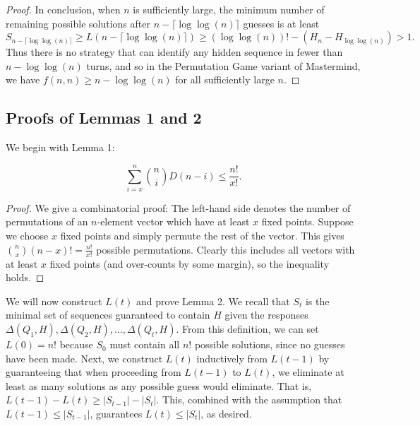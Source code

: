 \documentclass[12pt, a4paper]{article}
\begin{document}
\begin{proof}[Proof]
		 In conclusion, when $n$ is sufficiently large, the minimum number of remaining
		 possible solutions after $n - \lceil \log\log(n) \rceil$ guesses is at least
		 \begin{equation*}
		 S_{n - \lceil \log\log(n) \rceil} \geq L(n - \lceil \log\log(n) \rceil)
		 \ge (\log\log(n))! - (H_n - H_{\log\log(n)})
		 > 1.
		 \end{equation*}
		 Thus there is no strategy that can identify any hidden sequence in fewer than $n-\log\log(n)$ turns, and so in the Permutation Game variant of Mastermind, we have $f(n, n)\ge n - \log\log(n)$ for all sufficiently large $n$.
		\end{proof}
		 
		 
		 \subsection{Proofs of Lemmas 1 and 2}
		 	We begin with Lemma 1:
		 	
		 		\begin{equation*}
		 		\sum_{i=x}^n\binom{n}{i}D(n-i) \le \frac{n!}{x!}.
		 		\end{equation*}
		 
		 	\begin{proof}
		 		We give a combinatorial proof: The left-hand side denotes the number of permutations of an $n$-element vector which have at least $x$ fixed points. Suppose we choose $x$ fixed points and simply permute the rest of the vector. This gives $\binom{n}{x}(n-x)!=\frac{n!}{x!}$ possible permutations. Clearly this includes all vectors with at least $x$ fixed points (and over-counts by some margin), so the inequality holds.
		 	\end{proof}
		 We will now construct $L(t)$ and prove Lemma 2. We recall that $S_t$ is the minimal set of sequences guaranteed to contain $H$ given the responses\\ $\Delta(Q_1, H), \Delta(Q_2, H), \ldots, \Delta(Q_t, H)$. From this definition, we can set $L(0) = n!$ because $S_0$ must contain all $n!$ possible solutions, since no guesses have been made. Next, we construct $L(t)$ inductively from $L(t-1)$ by guaranteeing that when proceeding from $L(t-1)$ to $L(t)$, we eliminate at least as many solutions as any possible guess would eliminate. That is, $L(t-1)-L(t) \geq |S_{t-1}| - |S_{t}|$. This, combined with the assumption that $L(t-1) \le |S_{t-1}|$, guarantees $L(t) \leq |S_t|$, as desired. 
		 
\end{document}
